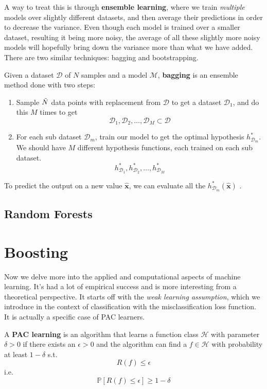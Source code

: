 \documentclass{article}
\begin{document}
  A way to treat this is through \textbf{ensemble learning}, where we train \textit{multiple} models over slightly different datasets, and then average their predictions in order to decrease the variance. Even though each model is trained over a smaller dataset, resulting it being more noisy, the average of all these slightly more noisy models will hopefully bring down the variance more than what we have added. There are two similar techniques: bagging and bootstrapping. 

  \begin{definition}
    Given a dataset $\mathcal{D}$ of $N$ samples and a model $\mathcal{M}$, \textbf{bagging} is an ensemble method done with two steps: 
    \begin{enumerate}
      \item Sample $\Tilde{N}$ data points with replacement from $\mathcal{D}$ to get a dataset $\mathcal{D}_1$, and do this $M$ times to get 
      \[\mathcal{D}_1, \mathcal{D}_2, \ldots, \mathcal{D}_M \subset \mathcal{D}\]
      \item For each sub dataset $\mathcal{D}_m$, train our model to get the optimal hypothesis $h_{\mathcal{D}_m}^\ast$. We should have $M$ different hypothesis functions, each trained on each sub dataset. 
      \[h_{\mathcal{D}_1}^\ast, h_{\mathcal{D}_2}^\ast, \ldots, h_{\mathcal{D}_M}^\ast\]
    \end{enumerate}
    To predict the output on a new value $\hat{\mathbf{x}}$, we can evaluate all the $h_{\mathcal{D}_m}^\ast (\hat{\mathbf{x}})$ .
  \end{definition}

  \subsection{Random Forests}

\section{Boosting} 

    Now we delve more into the applied and computational aspects of machine learning. It's had a lot of empirical success and is more interesting from a theoretical perspective. It starts off with the \textit{weak learning assumption}, which we introduce in the context of classification with the misclassification loss function. It is actually a specific case of PAC learners. 

    \begin{definition}
      A \textbf{PAC learning} is an algorithm that learns a function class $\mathcal{H}$ with parameter $\delta > 0$ if there exists an $\epsilon > 0$ and the algorithm can find a $f \in \mathcal{H}$ with probability at least $1 - \delta$ s.t.
      \begin{equation}
        R(f) \leq \epsilon 
      \end{equation}
      i.e. 
      \begin{equation}
        \mathbb{P}[ R(f) \leq \epsilon] \geq 1 - \delta
      \end{equation}
    \end{definition}
\end{document}
